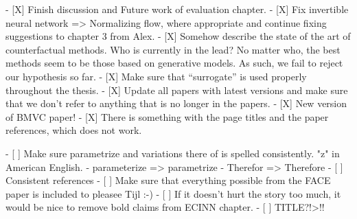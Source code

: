  - [X] Finish discussion and Future work of evaluation chapter.
  - [X] Fix invertible neural network => Normalizing flow, where appropriate and continue fixing suggestions to chapter 3 from Alex.
  - [X] Somehow describe the state of the art of counterfactual methods. Who is currently in the lead? No matter who, the best methods seem to be those based on generative models. As such, we fail to reject our hypothesis so far. 
  - [X] Make sure that ``surrogate'' is used properly throughout the thesis. 
  - [X] Update all papers with latest versions and make sure that we don't refer to anything that is no longer in the papers. 
  - [X] New version of BMVC paper!
  - [X] There is something with the page titles and the paper references, which does not work.
  
  - [ ] Make sure parametrize and variations there of is spelled consistently. "z" in American English.
        - parameterize => parametrize
        - Therefor => Therefore
  - [ ] Consistent references
  - [ ] Make sure that everything possible from the FACE paper is included to pleasee Tijl :-)
  - [ ] If it doesn't hurt the story too much, it would be nice to remove bold claims from ECINN chapter.
  - [ ] TITLE?!>!!